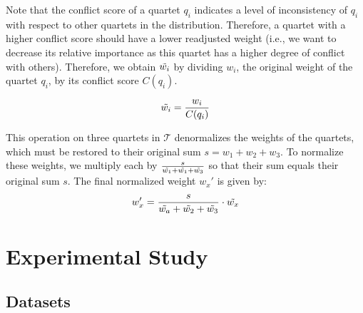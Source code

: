 \documentclass[10pt,a4paper]{article}
\begin{document}
Note that the conflict score of a quartet $q_i$ indicates a level of inconsistency of $q_i$ with respect to other quartets in the distribution. Therefore, a quartet with a higher conflict score should have a lower readjusted weight (i.e., we want to decrease its relative importance as this quartet has a higher degree of conflict with others). Therefore, we obtain $\Tilde{w_i}$ by dividing $ w_i $, the original weight of the quartet $ q_i $, by its conflict score $C(q_i)$.

$$
\Tilde{w_i} = \frac{w_i}{C(q_i)}
$$

This operation on three quartets in $\mathcal{T}$ denormalizes the weights of the quartets, which must be restored to their original sum $s = w_1+w_2+w_3$. %
To normalize these weights, we multiply each by $\frac{s}{\Tilde{w_1} + \Tilde{w_1} + \Tilde{w_3}}$ so that their sum equals their original sum $s$. The final normalized weight $w_x'$ is given by:
$$
w_x' = \frac{ s }{\Tilde{w_a} + \Tilde{w_2} + \Tilde{w_3}} \cdot \Tilde{w_x}
$$




\section{Experimental Study}
\subsection{Datasets}
%
\end{document}
